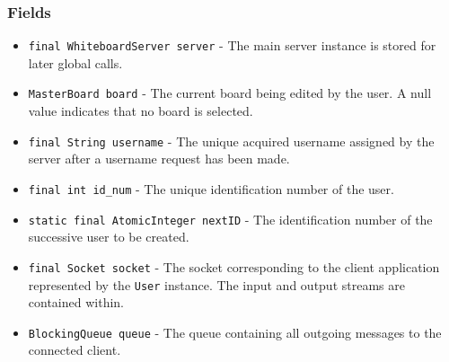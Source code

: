 \subsubsection{Fields}
\begin{itemize}
\item \texttt{final WhiteboardServer server} - The main server instance is stored for later global calls.
\item \texttt{MasterBoard board} - The current board being edited by the user. A null value indicates that no board is selected.
\item \texttt{final String username} - The unique acquired username assigned by the server after a username request has been made.
\item \texttt{final int id\_num} - The unique identification number of the user.
\item \texttt{static final AtomicInteger nextID} - The identification number of the successive user to be created.
\item \texttt{final Socket socket} - The socket corresponding to the client application represented by the \texttt{User} instance. The input and output streams are contained within.
\item \texttt{BlockingQueue queue} - The queue containing all outgoing messages to the connected client.
\end{itemize}

